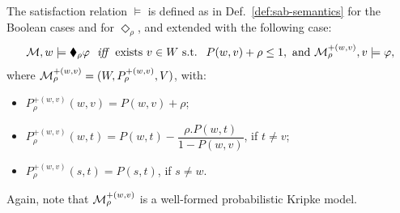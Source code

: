\begin{definition}
\label{def:br-sem}
The satisfaction relation $\models$ is defined as in Def.~\ref{def:sab-semantics} for the Boolean cases and for $\Diamond_\rho$, and extended with the following case:
\[
    \begin{array}{l@{\ \ }c@{\ \ }l}
    \model,w\models \blacklozenge_\rho \varphi & \iff &  \text{exists } v\in W \mbox{ s.t. } \ P(w,v)+\rho\leq 1, \mbox{ and } \model^{+(w,v)}_\rho, v \models\varphi, 
    \end{array}
\]
where $\mathcal{M}^{+(w,v)}_\rho = (W, P^{+(w,v)}_\rho,V)$, with:
\begin{itemize}
    \item $P^{+(w,v)}_\rho(w,v)=P(w,v)+\rho$;
    \item $P^{+(w,v)}_\rho(w,t)=P(w,t)-
\dfrac{\rho.P(w,t)}{1-P(w,v)}$, if $ t \neq v$;
    \item $P^{+(w,v)}_\rho(s,t)=P(s,t)$, if $s\neq w$.
\end{itemize}

Again, note that $\mathcal{M}^{+(w,v)}_\rho$ is a well-formed probabilistic Kripke model.
\end{definition}

